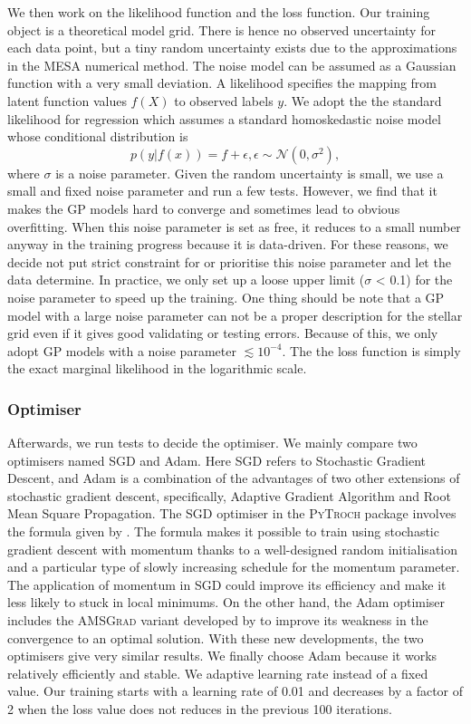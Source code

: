 We then work on the likelihood function and the loss function. Our training object is a theoretical model grid. There is hence no observed uncertainty for each data point, but a tiny random uncertainty exists due to the approximations in the \textsc{MESA} numerical method. The noise model can be assumed as a Gaussian function with a very small deviation. 
%   
A likelihood specifies the mapping from latent function values $f(X)$ to observed labels $y$.
We adopt the the standard likelihood for regression which assumes a standard homoskedastic noise model whose conditional distribution is
\begin{equation}\label{eq:likelihood}
p(y|f(x)) = f + \epsilon, \epsilon \sim \mathcal{N}(0, \sigma^{2}),
\end{equation}
where $\sigma$ is a noise parameter. 
%
Given the random uncertainty is small, we use a small and fixed noise parameter and run a few tests. However, we find that it makes the GP models hard to converge and sometimes lead to obvious overfitting. When this noise parameter is set as free, it reduces to a small number anyway in the training progress because it is data-driven. For these reasons, we decide not put strict constraint for or prioritise this noise parameter and let the data determine. In practice, we only set up a loose upper limit ($\sigma$  < 0.1) for the noise parameter to speed up the training. One thing should be note that a GP model with a large noise parameter can not be a proper description for the stellar grid even if it gives good validating or testing errors. Because of this, we only adopt GP models with a noise parameter $\lesssim 10^{-4}$.   
The the loss function is simply the exact marginal likelihood in the logarithmic scale.

\subsubsection{Optimiser}

Afterwards, we run tests to decide the optimiser. We mainly compare two optimisers named SGD and Adam. Here SGD refers to Stochastic Gradient Descent, and Adam is a combination of the advantages of two other extensions of stochastic gradient descent, specifically, Adaptive Gradient Algorithm and Root Mean Square Propagation. 
%
The SGD optimiser in the \textsc{PyTroch} package involves the formula given by \citet{sutskever2013importance}. The formula makes it possible to train using stochastic gradient descent with momentum thanks to a well-designed random initialisation and a particular type of slowly increasing schedule for the momentum parameter. The application of momentum in SGD could improve its efficiency and make it less likely to stuck in local minimums. On the other hand, the Adam optimiser includes the \textsc{AMSGrad} variant developed by \citet{47409} to improve its weakness in the convergence to an optimal solution. With these new developments, the two optimisers give very similar results. We finally choose Adam because it works relatively efficiently and stable.  
%
We adaptive learning rate instead of a fixed value. Our training starts with a learning rate of 0.01 and decreases by a factor of 2 when the loss value does not reduces in the previous 100 iterations.    

